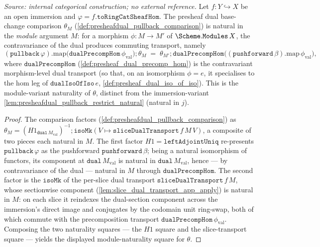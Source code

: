 \begin{lemma}

  \label{lem:presheafdual_pullback_comparison_natural_module}
  \textit{Source: internal categorical construction; no external reference.}
  Let \(f : Y \hookrightarrow X\) be an open immersion and \(\varphi = f.\mathtt{toRingCatSheafHom}\).
  The presheaf dual base-change comparison \(\theta_M\)
  (\cref{def:presheafdual_pullback_comparison}) is natural in the \emph{module} argument \(M\):
  for a morphism \(\phi : M \to M'\) of \(\Scheme.\mathtt{Modules}\,X\), the contravariance of the dual
  produces commuting transport, namely
  \[
    (\mathtt{pullback}\,\varphi).\mathrm{map}\bigl(\mathtt{dualPrecompHom}\,\phi_{\mathrm{val}}\bigr)
      \mathbin{;} \theta_M
    \;=\; \theta_{M'} \mathbin{;}
      \mathtt{dualPrecompHom}\bigl((\mathtt{pushforward}\,\beta).\mathrm{map}\,\phi_{\mathrm{val}}\bigr),
  \]
  where \(\mathtt{dualPrecompHom}\) (\cref{def:presheaf_dual_precomp_hom}) is the contravariant
  morphism-level dual transport (so that, on an isomorphism \(\phi = e\), it specialises to the
  \(\mathrm{hom}\) leg of \(\mathtt{dualIsoOfIso}\,e\), \cref{def:presheaf_dual_iso_of_iso}). This is
  the module-variant naturality of \(\theta\), distinct from the immersion-variant
  \cref{lem:presheafdual_pullback_restrict_natural} (natural in \(j\)).
\end{lemma}
\begin{proof}
  \leanok
  The comparison factors (\cref{def:presheafdual_pullback_comparison}) as
  \(\theta_M = (H1_{\mathtt{dual}\,M_{\mathrm{val}}})^{-1} \mathbin{;}
    \mathtt{isoMk}(V \mapsto \mathtt{sliceDualTransport}\,f\,M\,V)\), a composite of two pieces each
  natural in \(M\). The first factor \(H1 = \mathtt{leftAdjointUniq}\) re-presents
  \(\mathtt{pullback}\,\varphi\) as the pushforward \(\mathtt{pushforward}\,\beta\); being a natural
  isomorphism of functors, its component at \(\mathtt{dual}\,M_{\mathrm{val}}\) is natural in
  \(\mathtt{dual}\,M_{\mathrm{val}}\), hence --- by contravariance of the dual --- natural in \(M\)
  through \(\mathtt{dualPrecompHom}\). The second factor is the \(\mathtt{isoMk}\) of the per-slice
  dual transport \(\mathtt{sliceDualTransport}\,f\,M\), whose sectionwise component
  (\cref{lem:slice_dual_transport_app_apply}) is natural in \(M\): on each slice it reindexes the
  dual-section component across the immersion's direct image and conjugates by the codomain unit
  ring-swap, both of which commute with the precomposition transport
  \(\mathtt{dualPrecompHom}\,\phi_{\mathrm{val}}\). Composing the two naturality squares --- the
  \(H1\) square and the slice-transport square --- yields the displayed module-naturality square for
  \(\theta\).
\end{proof}


